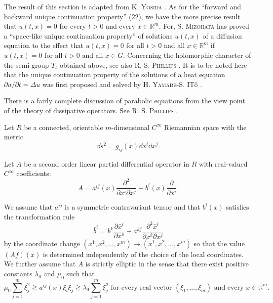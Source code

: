 
The result of this section is adapted from K. \textsc{Yosida} \cite{yosida364}. As for the ``forward and backward unique continuation property'' ($22$), we have the more precise result that $u(t, x) = 0$ for every $t > 0$ and every $x \in \mathbb{R}^{m}$. For, S. \textsc{Mizohata} \cite{mizohata210} has proved a ``space-like unique continuation property'' of solutions $u(t, x)$ of a diffusion equation to the effect that $u(t, x) = 0$ for all $t > 0$ and all $x \in \mathbb{R}^{m}$ if $u(t, x) = 0$ for all $t > 0$ and all $x \in G$. Concerning the holomorphic character of the semi-group $T_{t}$ obtained above, see also R. S. \textsc{Phillips} \cite{phillips256}. It is to be noted here that the unique continuation property of the solutions of a heat equation $\partial u/\partial t = \Delta u$ was first proposed and solved by H. \textsc{Yamabe}-S. ITô \cite{yamabe342}. 

There is a fairly complete discussion of parabolic equations from the view point of the theory of dissipative operators. See R. S. \textsc{Phillips} \cite{phillips257}. 


\label{sec:XIV.2}

Let $R$ be a connected, orientable $m$-dimensional $C^\infty$ Riemannian space with the metric 
\begin{equation}\label{eq:XIV.2.1}
\dd s ^{2} = g _{ij} (x) \dd x ^{i} \dd x ^{j}.
\end{equation}

Let $A$ be a second order linear partial differential operator in $R$ with real-valued $C^\infty$ coefficients: 
\begin{equation}\label{eq:XIV.2.2}
A = a ^{ij} (x) \frac {\partial^{2}}{\partial x ^{i} \partial x ^{j}} + b ^{i} (x) \frac {\partial}{\partial x ^{i}}.
\end{equation}

We assume that $a^{ij}$ is a symmetric contravariant tensor and that $b^{i}(x)$ satisfies the transformation rule 
\begin{equation}\label{eq:XIV.2.3}
\bar {b} ^{i} = b ^{k} \frac {\partial \bar {x} ^{i}}{\partial x ^{k}} + a ^{kj} \frac {\partial^{2} \bar {x} ^{i}}{\partial x ^{k} \partial x ^{j}}
\end{equation}
by the coordinate change $(x^{1}, x^{2}, \ldots, x^{m}) \to (\bar{x}^{1}, \bar{x}^{2}, \ldots, \bar{x}^{m})$ so that the value $(A f)(x)$ is determined independently of the choice of the local coordinates. We further assume that $A$ is strictly elliptic in the sense that there exist positive constants $\lambda_{0}$ and $\mu_{0}$ such that 
\begin{equation}\mu_{0} \sum\limits_{j=1} ^{m} \xi_{j} ^{2} \geqq a ^{ij} (x) \xi_{i} \xi_{j} \geqq \lambda_{0} \sum\limits_{j=1} ^{m} \xi_{j} ^{2} \text{ for every real vector } \left(\xi_{1}, \dots , \xi_{m}\right) \text{ and every } x \in \mathbb{R}^{m}. \label{eq:XIV.2.4}\end{equation}

